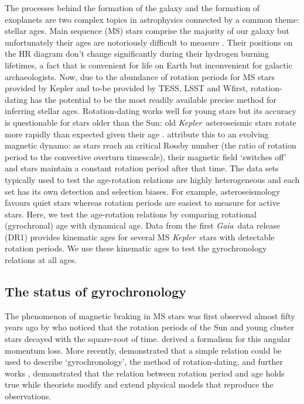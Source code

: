 \documentclass[useAMS, usenatbib, preprint, 12pt]{aastex}
\newcommand{\Kepler}{{\it Kepler}}
\newcommand{\kepler}{\Kepler}
\newcommand{\Gaia}{{\it Gaia}}
\newcommand{\eg}{{\it e.g.}}
\begin{document}
The processes behind the formation of the galaxy and the formation of
exoplanets are two complex topics in astrophysics connected by a common theme:
stellar ages.
Main sequence (MS) stars comprise the majority of our galaxy but unfortunately
their ages are notoriously difficult to measure \citep[see][for a
review]{Soderblom2010}.
Their positions on the HR diagram don't change significantly during their
hydrogen burning lifetimes, a fact that is convenient for life on Earth but
inconvenient for galactic archaeologists.
Now, due to the abundance of rotation periods for MS stars provided by Kepler
and to-be provided by TESS, LSST and Wfirst, rotation-dating has the potential
to be the most readily available precise method for inferring stellar ages.
Rotation-dating works well for young stars but its accuracy is questionable
for stars older than the Sun: old \kepler\ asteroseismic stars rotate more
rapidly than expected given their age \citep{Angus2015, Vansaders2016,
Metcalfe2016}.
\citet{Vansaders2016} attribute this to an evolving magnetic dynamo: as stars
reach an critical Rossby number (the ratio of rotation period to the
convective overturn timescale), their magnetic field `switches off' and stars
maintain a constant rotation period after that time.
The data sets typically used to test the age-rotation relations are highly
heterogeneous and each set has its own detection and selection biases.
For example, asteroseismology favours quiet stars whereas rotation periods are
easiest to measure for active stars.
Here, we test the age-rotation relations by comparing rotational (gyrochronal)
age with dynamical age.
Data from the first \Gaia\ data release (DR1) provides kinematic ages for
several MS \Kepler\ stars with detectable rotation periods.
We use these kinematic ages to test the gyrochronology relations at all ages.

\subsection{The status of gyrochronology}
The phenomenon of magnetic braking in MS stars was first observed almost fifty
years ago by \citet{Skumanich1972} who noticed that the rotation periods of
the Sun and young cluster stars decayed with the square-root of time.
\citet{Kawaler1988} derived a formalism for this angular momentum loss.
More recently, \citet{Barnes2003} demonstrated that a simple relation could be
used to describe `gyrochronology', the method of rotation-dating, and further
works \citep[\eg][]{Barnes2007, Mamajek2008, Barnes2010, Meibom2011},
demonstrated that the relation between rotation period and age holds true
while theorists \citep[\eg][]{Matt2012, Epstein2014, Vansaders2013,
Vansaders2015} modify and extend physical models that reproduce the
observations.
\end{document}
